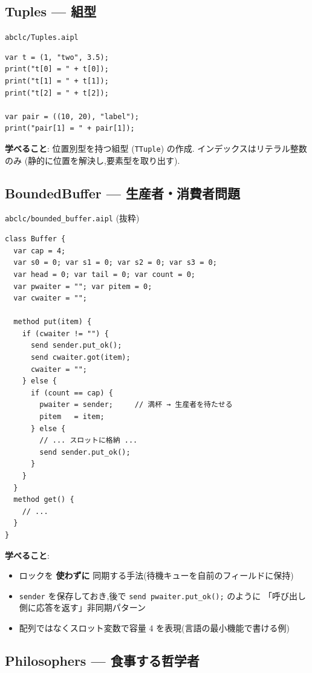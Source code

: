 \documentclass[11pt,a4paper]{article}
\begin{document}
\subsection{Tuples --- 組型}

\texttt{abclc/Tuples.aipl}

\begin{lstlisting}
var t = (1, "two", 3.5);
print("t[0] = " + t[0]);
print("t[1] = " + t[1]);
print("t[2] = " + t[2]);

var pair = ((10, 20), "label");
print("pair[1] = " + pair[1]);
\end{lstlisting}

\textbf{学べること}: 位置別型を持つ組型 (\texttt{TTuple}) の作成.
インデックスはリテラル整数のみ (静的に位置を解決し,要素型を取り出す).

\subsection{BoundedBuffer --- 生産者・消費者問題}

\texttt{abclc/bounded\_buffer.aipl} (抜粋)

\begin{lstlisting}
class Buffer {
  var cap = 4;
  var s0 = 0; var s1 = 0; var s2 = 0; var s3 = 0;
  var head = 0; var tail = 0; var count = 0;
  var pwaiter = ""; var pitem = 0;
  var cwaiter = "";

  method put(item) {
    if (cwaiter != "") {
      send sender.put_ok();
      send cwaiter.got(item);
      cwaiter = "";
    } else {
      if (count == cap) {
        pwaiter = sender;     // 満杯 → 生産者を待たせる
        pitem   = item;
      } else {
        // ... スロットに格納 ...
        send sender.put_ok();
      }
    }
  }
  method get() {
    // ...
  }
}
\end{lstlisting}

\textbf{学べること}:

\begin{itemize}
  \item ロックを \textbf{使わずに} 同期する手法(待機キューを自前のフィールドに保持)
  \item \texttt{sender} を保存しておき,後で \texttt{send pwaiter.put\_ok();} のように
        「呼び出し側に応答を返す」非同期パターン
  \item 配列ではなくスロット変数で容量 4 を表現(言語の最小機能で書ける例)
\end{itemize}

\subsection{Philosophers --- 食事する哲学者}
\end{document}
